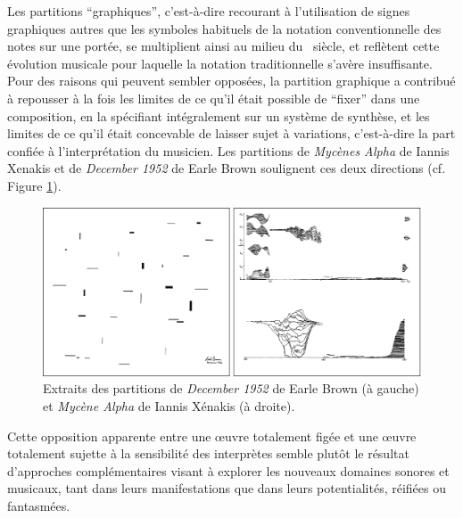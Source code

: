 \indent Les partitions ``graphiques'', c'est-à-dire recourant à l'utilisation de signes graphiques autres que les symboles habituels de la notation conventionnelle des notes sur une portée, se multiplient ainsi au milieu du ~siècle, et reflètent cette évolution musicale pour laquelle la notation traditionnelle s'avère insuffisante. Pour des raisons qui peuvent sembler opposées, la partition graphique a contribué à repousser à la fois les limites de ce qu'il était possible de ``fixer'' dans une composition, en la spécifiant intégralement sur un système de synthèse, et les limites de ce qu'il était concevable de laisser sujet à variations, c'est-à-dire la part confiée à l'interprétation du musicien. Les partitions de \textit{Mycènes Alpha} de Iannis Xenakis et de \textit{December 1952} de Earle Brown  soulignent ces deux directions (cf. Figure \ref{fig:notation:brown-xenakis}).
\begin{figure}[!htbp]
	\captionsetup{format=plain}
	\includegraphics[width=\textwidth]{gfx/notation/Brown-Xenakis-Paysage.png}
	\caption[Partitions de \textit{December 1952} et \textit{Mycènes Alpha} (extraits)]{Extraits des partitions de \textit{December 1952} de Earle Brown (à gauche) et \textit{Mycène Alpha} de Iannis Xénakis (à droite).}
	\label{fig:notation:brown-xenakis}
\end{figure}

\noindent Cette opposition apparente entre une œuvre totalement figée et une œuvre totalement sujette à la sensibilité des interprètes semble plutôt le résultat d'approches complémentaires visant à explorer les nouveaux domaines sonores et musicaux, tant dans leurs manifestations que dans leurs potentialités, réifiées ou fantasmées.

